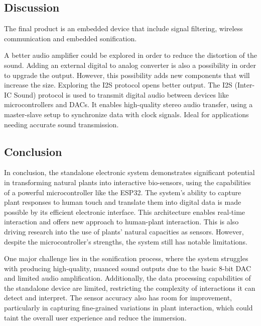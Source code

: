 

\subsection{Discussion}

The final product is an embedded device that include signal filtering, wireless communication and embedded sonification.


A better audio amplifier could be explored in order to reduce the distortion of the sound.
Adding an external digital to analog converter is also a possibility in order to upgrade the output. However, this possibility adds new components that will increase the size. Exploring the I2S protocol opens better output.
The I2S (Inter-IC Sound) protocol is used to transmit digital audio between devices like microcontrollers and DACs. It enables high-quality stereo audio transfer, using a master-slave setup to synchronize data with clock signals. Ideal for applications needing accurate sound transmission.



\subsection{Conclusion}

In conclusion, the standalone electronic system demonstrates significant potential in transforming natural plants into interactive bio-sensors, using the capabilities of a powerful microcontroller like the ESP32. The system's ability to capture plant responses to human touch and translate them into digital data is made possible by its efficient electronic interface. This architecture enables real-time interaction and offers new approach to human-plant interaction. This is also driving research into the use of plants' natural capacities as sensors. However, despite the microcontroller's strengths, the system still has notable limitations.

One major challenge lies in the sonification process, where the system struggles with producing high-quality, nuanced sound outputs due to the basic 8-bit DAC and limited audio amplification. Additionally, the data processing capabilities of the standalone device are limited, restricting the complexity of interactions it can detect and interpret. The sensor accuracy also has room for improvement, particularly in capturing fine-grained variations in plant interaction, which could taint the overall user experience and reduce the immersion.

